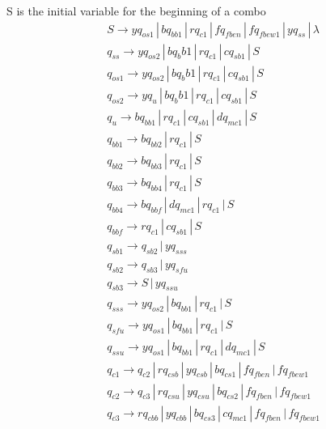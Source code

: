 \documentclass{article}
\begin{document}
\begin{mylist}
\begin{table}[h]
\begin{tabular}{l | l}
  \end{tabular}
\end{table}
S is the initial variable for the beginning of a combo
\begin{align*}
&S \rightarrow yq_{os1} \, | \, bq_{bb1} \, | \, rq_{c1} \, | \, fq_{fben} \, | \, fq_{fbew1} \, | \, yq_{ss} \, | \, \lambda \\
&q_{ss} \rightarrow yq_{os2} \, | \, b{q_bb1} \, | \, rq_{c1} \, | \, cq_{sb1} \, | \, S\\
&q_{os1} \rightarrow yq_{os2} \, | \, b{q_bb1} \, | \, rq_{c1} \, | \, cq_{sb1} \, | \, S\\
&q_{os2} \rightarrow yq_{u} \, | \, b{q_bb1} \, | \, rq_{c1} \, | \, cq_{sb1} \, | \, S\\
&q_{u} \rightarrow bq_{bb1} \, | \, rq_{c1} \, | \,cq_{sb1} \, | \, dq_{mc1} \, | \, S\\
&q_{bb1} \rightarrow bq_{bb2} \, | \, rq_{c1} \, | \, S \\ 
&q_{bb2} \rightarrow bq_{bb3} \, | \, rq_{c1} \, | \, S \\ 
&q_{bb3} \rightarrow bq_{bb4} \, | \, rq_{c1} \, | \, S \\ 
&q_{bb4} \rightarrow bq_{bbf} \, | \, dq_{mc1} \, | \, rq_{c1} \, | \, S \\ 
&q_{bbf} \rightarrow rq_{c1} \, | \, cq_{sb1} \, | \, S \\ 
&q_{sb1} \rightarrow q_{sb2} \, | \, yq_{sss} \\ 
&q_{sb2} \rightarrow q_{sb3} \, | \, yq_{sfu} \\ 
&q_{sb3} \rightarrow S \, | \, yq_{ssu} \\ 
&q_{sss} \rightarrow yq_{os2} \, | \, bq_{bb1} \, | \, rq_{c1} \, | \, S\\ 
&q_{sfu} \rightarrow yq_{os1} \, | \, bq_{bb1} \, | \, rq_{c1} \, | \, S\\ 
&q_{ssu} \rightarrow yq_{os1} \, | \, bq_{bb1} \, | \, rq_{c1} \, | \, dq_{mc1}\, | \, S\\ 
&q_{c1} \rightarrow q_{c2} \, | \,  rq_{csb} \, | \, yq_{csb} \, | \, bq_{cs1} \, | \, fq_{fben} \, | \, fq_{fbew1}\\ 
&q_{c2} \rightarrow q_{c3} \, | \,  rq_{csu} \, | \, yq_{csu} \, | \, bq_{cs2} \, | \, fq_{fben} \, | \, fq_{fbew1}\\ 
&q_{c3} \rightarrow rq_{cbb} \, | \,  yq_{cbb} \, | \, bq_{cs3} \, | \, cq_{mc1} \, | \, fq_{fben} \, | \, fq_{fbew1}\ \\ 

\end{align*}
\end{mylist}
\end{document}
